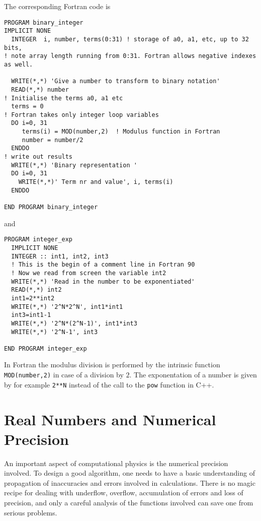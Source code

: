 The corresponding Fortran  code is 
\lstset{language=[90]Fortran}
\begin{lstlisting}[title={\url{http://folk.uio.no/mhjensen/compphys/programs/chapter02/Fortran/program2.f90}}]
PROGRAM binary_integer
IMPLICIT NONE
  INTEGER  i, number, terms(0:31) ! storage of a0, a1, etc, up to 32 bits, 
! note array length running from 0:31. Fortran allows negative indexes as well.

  WRITE(*,*) 'Give a number to transform to binary notation' 
  READ(*,*) number
! Initialise the terms a0, a1 etc
  terms = 0
! Fortran takes only integer loop variables
  DO i=0, 31
     terms(i) = MOD(number,2)  ! Modulus function in Fortran
     number = number/2
  ENDDO
! write out results
  WRITE(*,*) 'Binary representation '
  DO i=0, 31
    WRITE(*,*)' Term nr and value', i, terms(i)
  ENDDO

END PROGRAM binary_integer
\end{lstlisting}
and
\lstset{language=[90]Fortran}
\begin{lstlisting}[title={\url{http://folk.uio.no/mhjensen/compphys/programs/chapter02/Fortran/program3.f90}}]
PROGRAM integer_exp
  IMPLICIT NONE
  INTEGER :: int1, int2, int3
  ! This is the begin of a comment line in Fortran 90
  ! Now we read from screen the variable int2
  WRITE(*,*) 'Read in the number to be exponentiated'   
  READ(*,*) int2 
  int1=2**int2
  WRITE(*,*) '2^N*2^N', int1*int1
  int3=int1-1
  WRITE(*,*) '2^N*(2^N-1)', int1*int3
  WRITE(*,*) '2^N-1', int3

END PROGRAM integer_exp
\end{lstlisting}
In Fortran the modulus division is performed by the intrinsic function \verb?MOD(number,2)?
in case of a division by $2$. The exponentation of a number is given by for example \verb?2**N?
instead of the call to the \verb?pow? function in C++.





\section{Real Numbers and Numerical Precision}

An important aspect of computational physics is 
the numerical precision involved. To design a good algorithm,
one needs to have a basic understanding of propagation
of inaccuracies and errors involved in calculations.
There is no magic recipe for dealing with underflow, overflow,
accumulation of errors and loss of precision, and only
a careful analysis of the functions involved can save
one from serious problems.


